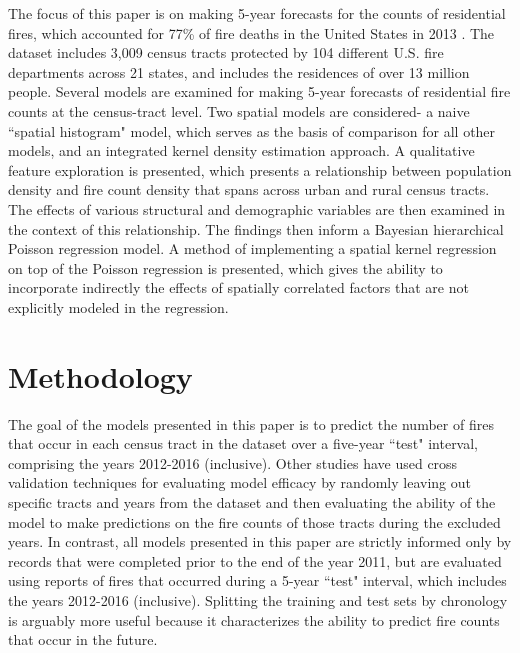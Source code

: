 \documentclass{svjour3}
\begin{document}
The focus of this paper is on making 5-year forecasts for the counts of residential fires, which accounted for 77\% of fire deaths in the United States in 2013 \cite{usfa}. The dataset includes 3,009 census tracts protected by 104 different U.S. fire departments across 21 states, and includes the residences of over 13 million people. Several models are examined for making 5-year forecasts of residential fire counts at the census-tract level. Two spatial models are considered- a naive ``spatial histogram" model, which serves as the basis of comparison for all other models, and an integrated kernel density estimation approach. A qualitative feature exploration is presented, which presents a relationship between population density and fire count density that spans across urban and rural census tracts. The effects of various structural and demographic variables are then examined in the context of this relationship. The findings then inform a Bayesian hierarchical Poisson regression model. A method of implementing a spatial kernel regression on top of the Poisson regression is presented, which gives the ability to incorporate indirectly the effects of spatially correlated factors that are not explicitly modeled in the regression.



 
\section{Methodology}
The goal of the models presented in this paper is to predict the number of fires that occur in each census tract in the dataset over a five-year ``test" interval, comprising the years 2012-2016 (inclusive). Other studies have used cross validation techniques for evaluating model efficacy by randomly leaving out specific tracts and years from the dataset and then evaluating the ability of the model to make predictions on the fire counts of those tracts during the excluded years. In contrast, all models presented in this paper are strictly informed only by records that were completed prior to the end of the year 2011, but are evaluated using reports of fires that occurred during a 5-year ``test" interval, which includes the years 2012-2016 (inclusive). Splitting the training and test sets by chronology is arguably more useful because it characterizes the ability to predict fire counts that occur in the future.
\end{document}
